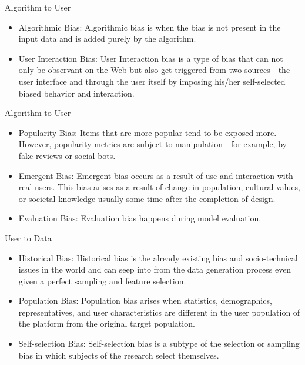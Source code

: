 \documentclass[10pt, xcolor=table,aspectratio=169]{beamer}
\begin{document}
\begin{frame}{Algorithm to User}
	\begin{itemize}
		\item Algorithmic Bias: Algorithmic bias is when the bias is not present in the input data and is added purely by the algorithm.
		\item User Interaction Bias: User Interaction bias is a type of bias that can not only be observant on the Web but also get triggered from two sources—the user interface and through the user itself by imposing his/her self-selected biased behavior and interaction.

	\end{itemize}

\end{frame}

\begin{frame}{Algorithm to User}
	\begin{itemize}
		\item Popularity Bias: Items that are more popular tend to be exposed more. However, popularity metrics are subject to manipulation—for example, by fake reviews or social bots.
		\item Emergent Bias: Emergent bias occurs as a result of use and interaction with real users. This bias arises as a result of change in population, cultural values, or societal knowledge usually some time after the completion of design.
		\item Evaluation Bias: Evaluation bias happens during model evaluation.

	\end{itemize}

\end{frame}

\begin{frame}{User to Data}
	\begin{itemize}
		\item Historical Bias: Historical bias is the already existing bias and socio-technical issues in the world and can seep into from the data generation process even given a perfect sampling and feature selection.
		\item Population Bias: Population bias arises when  statistics, demographics, representatives, and user characteristics are different in the user population of the platform from the original target population.
		\item Self-selection Bias: Self-selection bias is a subtype of the selection or sampling bias in which subjects of the research select themselves.


	\end{itemize}

\end{frame}
\end{document}

